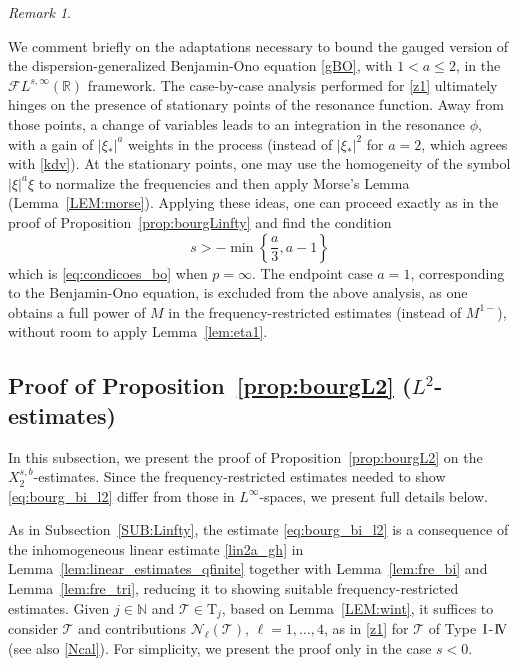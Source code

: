 \documentclass[a4paper,
11pt,  reqno]{amsart}
\newcommand{\I}{\hspace{0.2mm}\textup{I}\hspace{0.2mm}}
\newcommand{\IV}{\textup{I \hspace{-2.9mm} V}}
\newcommand{\5}{\textup{V}}
\newcommand{\FL}{\mathcal{F} L}
\theoremstyle{remark}
\newtheorem{remark}[theorem]{Remark}
\newcommand{\R}{\mathbb{R}}
\newcommand{\TT}{\mathcal{T}}
\newcommand{\Tr}{\mathrm{T}}
\renewcommand{\l}{\ell}
\newcommand{\N}{\mathbb{N}}
\numberwithin{equation}{section}
\numberwithin{theorem}{section}
\newcommand{\Ncal}{\mathcal{N}}
\begin{document}
\begin{remark}\label{remark:bo1}

    We comment briefly on the adaptations necessary to bound the gauged version of the dispersion-generalized Benjamin-Ono equation \eqref{gBO}, with $1< a\le 2$, in the $\FL^{s,\infty}(\R)$ framework. 
    The case-by-case analysis performed for \eqref{z1} ultimately hinges on the presence of stationary points of the resonance function. Away from those points, a change of variables leads to an integration in the resonance $\phi$, with a gain of $|\xi_\ast|^a$ weights in the process (instead of $|\xi_\ast|^2$ for $a=2$, which agrees with \eqref{kdv}). At the stationary points, one may use the homogeneity of the symbol $|\xi|^a \xi$ to normalize the frequencies and then apply Morse's Lemma (Lemma~\ref{LEM:morse}).
    Applying these ideas, one can proceed exactly as in the proof of Proposition~\ref{prop:bourgLinfty} and find the condition
    $$
    s>-\min\left\{\frac a 3, a-1\right\}
    $$
    which is \eqref{eq:condicoes_bo} when $p=\infty$. The endpoint case $a=1$, corresponding to the Benjamin-Ono equation, is excluded from the above analysis, as one obtains a full power of $M$ in the frequency-restricted estimates (instead of $M^{1-}$), without room to apply Lemma~\ref{lem:eta1}.
\end{remark}





\subsection{Proof of Proposition~\ref{prop:bourgL2} ($L^2$-estimates)}
\label{SUB:L2}


In this subsection, we present the proof of Proposition~\ref{prop:bourgL2}
on the $X^{s, b}_{2}$-estimates. 
Since the frequency-restricted estimates needed to show \eqref{eq:bourg_bi_l2} differ from those in $L^\infty$-spaces, we present full details below. 




As in Subsection~\ref{SUB:Linfty}, 
the estimate \eqref{eq:bourg_bi_l2} is a consequence of the inhomogeneous linear estimate \eqref{lin2a_gh} in Lemma~\ref{lem:linear_estimates_qfinite} together with Lemma~\ref{lem:fre_bi} and Lemma~\ref{lem:fre_tri}, reducing it to showing suitable frequency-restricted  estimates. 
Given $j\in \N$ and $\TT\in \Tr_j$,
based on Lemma~\ref{LEM:wint}, it suffices to consider $\TT$ and contributions $\Ncal_
\l(\TT)$, $\l=1, \ldots, 4$, as in \eqref{z1} for $\TT$ of Type $\I$-$\IV$ (see also \eqref{Ncal}). {
For simplicity, we present the proof only in the case $s<0$. 
}
\end{document}
